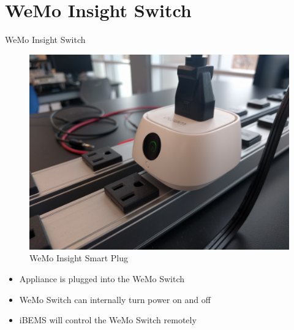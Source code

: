 \documentclass{beamer}
\begin{document}
\section{WeMo Insight Switch}

\begin{frame}{WeMo Insight Switch}{} %
    \begin{multicols}{2}
        \begin{figure}
            \centering
            \includegraphics[scale=0.045]{figs/wemoView.jpg}
            \caption{WeMo Insight Smart Plug}
            \label{fig:wemo}
        \end{figure}
        \textsc{}
        \begin{itemize}
            \item Appliance is plugged into the WeMo Switch
            \item WeMo Switch can internally turn power on and off
            \item iBEMS will control the WeMo Switch remotely
        \end{itemize}
    \end{multicols}
\end{frame}
\end{document}

